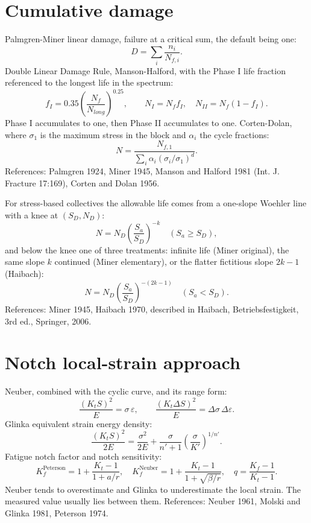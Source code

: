 \documentclass[11pt]{article}
\begin{document}
\section{Cumulative damage}
Palmgren-Miner linear damage, failure at a critical sum, the default being one:
\begin{equation}
D = \sum_i \frac{n_i}{N_{f,i}}.
\end{equation}
Double Linear Damage Rule, Manson-Halford, with the Phase I life fraction
referenced to the longest life in the spectrum:
\begin{equation}
f_I = 0.35\left(\frac{N_f}{N_{long}}\right)^{0.25},
\qquad N_I = N_f f_I, \quad N_{II} = N_f(1-f_I).
\end{equation}
Phase I accumulates to one, then Phase II accumulates to one. Corten-Dolan, where
\(\sigma_1\) is the maximum stress in the block and \(\alpha_i\) the cycle fractions:
\begin{equation}
N = \frac{N_{f,1}}{\sum_i \alpha_i (\sigma_i/\sigma_1)^{d}}.
\end{equation}
References: Palmgren 1924, Miner 1945, Manson and Halford 1981 (Int. J. Fracture
17:169), Corten and Dolan 1956.

For stress-based collectives the allowable life comes from a one-slope Woehler
line with a knee at \((S_D, N_D)\):
\begin{equation}
N = N_D \left(\frac{S_a}{S_D}\right)^{-k} \quad (S_a \ge S_D),
\end{equation}
and below the knee one of three treatments: infinite life (Miner original),
the same slope \(k\) continued (Miner elementary), or the flatter fictitious
slope \(2k-1\) (Haibach):
\begin{equation}
N = N_D \left(\frac{S_a}{S_D}\right)^{-(2k-1)} \quad (S_a < S_D).
\end{equation}
References: Miner 1945, Haibach 1970, described in Haibach,
Betriebsfestigkeit, 3rd ed., Springer, 2006.

\section{Notch local-strain approach}
Neuber, combined with the cyclic curve, and its range form:
\begin{equation}
\frac{(K_t S)^2}{E} = \sigma\,\varepsilon,
\qquad
\frac{(K_t \Delta S)^2}{E} = \Delta\sigma\,\Delta\varepsilon.
\end{equation}
Glinka equivalent strain energy density:
\begin{equation}
\frac{(K_t S)^2}{2E} = \frac{\sigma^2}{2E} + \frac{\sigma}{n'+1}\left(\frac{\sigma}{K'}\right)^{1/n'}.
\end{equation}
Fatigue notch factor and notch sensitivity:
\begin{equation}
K_f^{\text{Peterson}} = 1 + \frac{K_t-1}{1+a/r},
\quad
K_f^{\text{Neuber}} = 1 + \frac{K_t-1}{1+\sqrt{\beta/r}},
\quad
q = \frac{K_f-1}{K_t-1}.
\end{equation}
Neuber tends to overestimate and Glinka to underestimate the local strain. The
measured value usually lies between them. References: Neuber 1961, Molski and
Glinka 1981, Peterson 1974.
\end{document}
